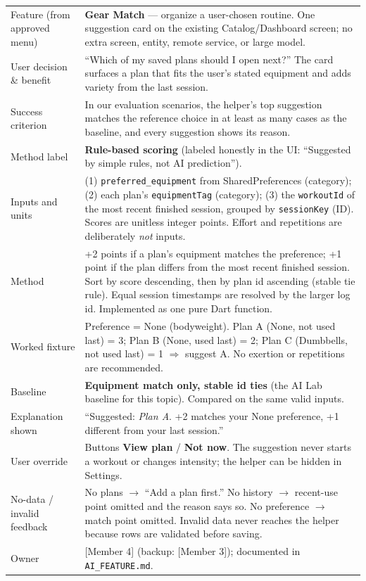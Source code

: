 \documentclass[11pt]{article}
\newcommand{\ph}[1]{\textcolor{ph}{[#1]}}
\begin{document}
\begin{tabularx}{\textwidth}{@{}P{3.6cm}L@{}}
\toprule
Feature (from approved menu) & \textbf{Gear Match} --- organize a user-chosen routine. One suggestion card on the existing Catalog/Dashboard screen; no extra screen, entity, remote service, or large model. \\
User decision \& benefit & ``Which of my saved plans should I open next?'' The card surfaces a plan that fits the user's stated equipment and adds variety from the last session. \\
Success criterion & In our evaluation scenarios, the helper's top suggestion matches the reference choice in at least as many cases as the baseline, and every suggestion shows its reason. \\
Method label & \textbf{Rule-based scoring} (labeled honestly in the UI: ``Suggested by simple rules, not AI prediction''). \\
Inputs and units & (1) \texttt{preferred\_equipment} from SharedPreferences (category); (2) each plan's \texttt{equipmentTag} (category); (3) the \texttt{workoutId} of the most recent finished session, grouped by \texttt{sessionKey} (ID). Scores are unitless integer points. Effort and repetitions are deliberately \emph{not} inputs. \\
Method & +2 points if a plan's equipment matches the preference; +1 point if the plan differs from the most recent finished session. Sort by score descending, then by plan id ascending (stable tie rule). Equal session timestamps are resolved by the larger log id. Implemented as one pure Dart function. \\
Worked fixture & Preference = None (bodyweight). Plan A (None, not used last) = 3; Plan B (None, used last) = 2; Plan C (Dumbbells, not used last) = 1 $\Rightarrow$ suggest A. No exertion or repetitions are recommended. \\
Baseline & \textbf{Equipment match only, stable id ties} (the AI Lab baseline for this topic). Compared on the same valid inputs. \\
Explanation shown & ``Suggested: \emph{Plan A}. +2 matches your None preference, +1 different from your last session.'' \\
User override & Buttons \textbf{View plan} / \textbf{Not now}. The suggestion never starts a workout or changes intensity; the helper can be hidden in Settings. \\
No-data / invalid feedback & No plans $\rightarrow$ ``Add a plan first.'' No history $\rightarrow$ recent-use point omitted and the reason says so. No preference $\rightarrow$ match point omitted. Invalid data never reaches the helper because rows are validated before saving. \\
Owner & \ph{Member 4} (backup: \ph{Member 3}); documented in \texttt{AI\_FEATURE.md}. \\
\bottomrule
\end{tabularx}
\end{document}
